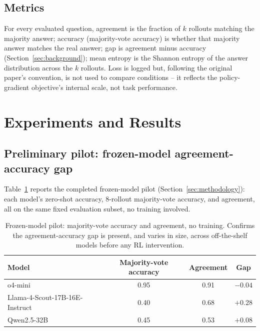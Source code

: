 \documentclass{article}
\begin{document}
\subsection{Metrics}

For every evaluated question, agreement is the fraction of $k$ rollouts
matching the majority answer; accuracy (majority-vote accuracy) is whether
that majority answer matches the real answer; gap is agreement minus
accuracy (Section~\ref{sec:background}); mean entropy is the Shannon entropy
of the answer distribution across the $k$ rollouts. Loss is logged but,
following the original paper's convention, is not used to compare
conditions -- it reflects the policy-gradient objective's internal scale,
not task performance.


\section{Experiments and Results}
\label{sec:results}

\subsection{Preliminary pilot: frozen-model agreement-accuracy gap}

Table~\ref{tab:pilot} reports the completed frozen-model pilot
(Section~\ref{sec:methodology}): each model's zero-shot accuracy, 8-rollout
majority-vote accuracy, and agreement, all on the same fixed evaluation
subset, no training involved.

\begin{table}[h]
  \caption{Frozen-model pilot: majority-vote accuracy and agreement, no
  training. Confirms the agreement-accuracy gap is present, and varies in
  size, across off-the-shelf models before any RL intervention.}
  \label{tab:pilot}
  \centering
  \begin{tabular}{lccc}
    \toprule
    Model & Majority-vote accuracy & Agreement & Gap \\
    \midrule
    o4-mini                        & 0.95 & 0.91 & $-0.04$ \\
    Llama-4-Scout-17B-16E-Instruct & 0.40 & 0.68 & $+0.28$ \\
    Qwen2.5-32B                    & 0.45 & 0.53 & $+0.08$ \\
    \bottomrule
  \end{tabular}
\end{table}
\end{document}
